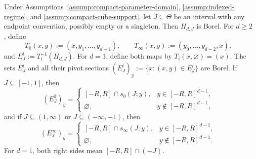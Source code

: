 \begin{lemma}
\label{lem:borel-sections}
Under Assumptions~\ref{assump:compact-parameter-domain},
\ref{assump:indexed-regime}, and \ref{assump:compact-cube-support}, let
$J\subseteq\Theta$ be an interval with any endpoint convention, possibly
empty or a singleton.  Then $H_{d,J}$ is Borel.  For $d\geq2$, define
\[
T_0(x,y):=(x,y_1,\ldots,y_{d-1}),\qquad
T_\infty(x,y):=(y_0,\ldots,y_{d-2},x),
\]
and $E^i_J:=T_i^{-1}(H_{d,J})$.  For $d=1$, define both maps by
$T_i(x,\varnothing)=(x)$.  The sets $E^i_J$ and all their pivot sections
$(E^i_J)_y:=\{x:(x,y)\in E^i_J\}$ are Borel.  If $J\subseteq[-1,1]$, then
\begin{equation}
(E^0_J)_y=
\begin{cases}
[-R,R]\cap s_0(J;y),&y\in[-R,R]^{d-1},\\
\varnothing,&y\notin[-R,R]^{d-1},
\end{cases}
\label{eq:inner-section}
\end{equation}
and if $J\subseteq(1,\infty)$ or $J\subseteq(-\infty,-1)$, then
\begin{equation}
(E^\infty_J)_y=
\begin{cases}
[-R,R]\cap s_\infty(J;y),&y\in[-R,R]^{d-1},\\
\varnothing,&y\notin[-R,R]^{d-1}.
\end{cases}
\label{eq:outer-section}
\end{equation}
For $d=1$, both right sides mean $[-R,R]\cap(-J)$.
\end{lemma}

